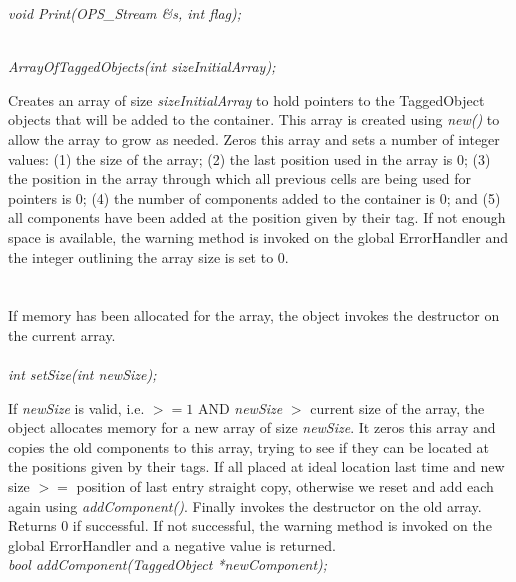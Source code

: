 {\em void Print(OPS_Stream \&s, int flag);}


 \\
{\em ArrayOfTaggedObjects(int sizeInitialArray);} 

Creates an array of size {\em sizeInitialArray} to hold pointers to
the TaggedObject objects that will be added to the container. This
array is created using {\em new()} to allow the array to grow as
needed. Zeros this array and sets a number of integer values: (1) the
size of the array; (2) the last position used in the array is $0$; (3)
the position in the array through which all previous cells are being
used for pointers is $0$; (4) the number of components added to the
container is $0$; and (5) all components have been added at the
position given by their tag. If not enough space is available, the
warning method is invoked on the global ErrorHandler and the integer
outlining the array size is set to $0$. \\ 

 \\
 \\ 
If memory has been allocated for the array, the object invokes the
destructor on the current array. \\ 

 \\
{\em int setSize(int newSize);}

If {\em newSize} is valid, i.e. $>= 1$ AND {\em newSize} $>$ current
size of the array, the object allocates memory for a new array of size
{\em newSize}. It zeros this array and copies the old components to
this array, trying to see if they can be located at the positions
given by their tags. If all placed at ideal location last time and new
size $>=$ position of last entry straight copy, otherwise we reset and
add each again using {\em addComponent()}. Finally invokes the
destructor on the old array. Returns $0$ if successful. If not
successful, the warning method is invoked on the global ErrorHandler
and a negative value is returned.\\ 


{\em bool addComponent(TaggedObject *newComponent);}

